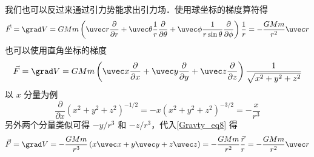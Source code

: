 我们也可以反过来通过引力势能求出引力场．使用球坐标的梯度算符得%
\begin{equation}
\vec F = \grad V = GMm\left( {\uvec r\frac{\partial }{{\partial r}} + \uvec \theta \frac{1}{r}\frac{\partial }{{\partial \theta }} + \uvec \phi \frac{1}{{r\sin \theta }}\frac{\partial }{{\partial \phi }}} \right)\frac{1}{r} =  - \frac{{GMm}}{{{r^2}}}\uvec r
\end{equation}
也可以使用直角坐标的梯度
\begin{equation}\label{Gravty_eq8}
\vec F = \grad V = GMm\left( {\uvec x\frac{\partial }{{\partial x}} + \uvec y\frac{\partial }{{\partial y}} + \uvec z\frac{\partial }{{\partial z}}} \right)\frac{1}{{\sqrt {{x^2} + {y^2} + {z^2}} }}
\end{equation}
以 $x$ 分量为例
\begin{equation}
\frac{\partial }{{\partial x}}{({x^2} + {y^2} + {z^2})^{ - 1/2}} =  - x{({x^2} + {y^2} + {z^2})^{ - 3/2}} =  - \frac{x}{{{r^3}}}
\end{equation}
另外两个分量类似可得 $- y/{r^3}$ 和 $- z/{r^3}$，代入\autoref{Gravty_eq8} 得
\begin{equation}
\vec F = \grad V =  - \frac{{GMm}}{{{r^3}}}\left( {x\uvec x + y\uvec y + z\uvec z} \right) =  - \frac{{GMm}}{{{r^2}}}\frac{{\vec r}}{r} =  - \frac{{GMm}}{{{r^2}}}\uvec r
\end{equation}

